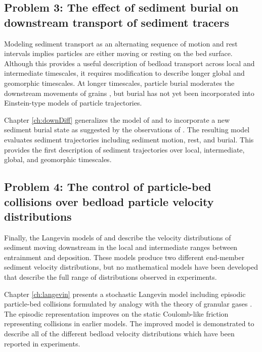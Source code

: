 \subsection{Problem 3: The effect of sediment burial on downstream transport of sediment tracers}

Modeling sediment transport as an alternating sequence of motion and rest intervals implies particles are either moving or resting on the bed surface. Although this provides a useful description of bedload transport across local and intermediate timescales, it requires modification to describe longer global and geomorphic timescales. 
At longer timescales, particle burial moderates the downstream movements of grains \citep{Hassan2017,Bradley2017}, but burial has not yet been incorporated into Einstein-type models of particle trajectories. 

Chapter \ref{ch:downDiff} generalizes the model of \citet{Lisle1998} and \citet{Lajeunesse2017} to incorporate a new sediment burial state as suggested by the observations of \citet{Bradley2017}. The resulting model evaluates sediment trajectories including sediment motion, rest, and burial.
This provides the first description of sediment trajectories over local, intermediate, global, and geomorphic timescales.

\subsection{Problem 4: The control of particle-bed collisions over bedload particle velocity distributions}

Finally, the Langevin models of \citet{Fan2014} and \citet{Ancey2014} describe the velocity distributions of sediment moving downstream in the local and intermediate ranges between entrainment and deposition.
These models produce two different end-member sediment velocity distributions, but no mathematical models have been developed that describe the full range of distributions observed in experiments.

Chapter \ref{ch:langevin} presents a stochastic Langevin model including episodic particle-bed collisions formulated by analogy with the theory of granular gases \citep{Brilliantov2004}.
The episodic representation improves on the static Coulomb-like friction representing collisions in earlier models.
The improved model is demonstrated to describe all of the different bedload velocity distributions which have been reported in experiments.


